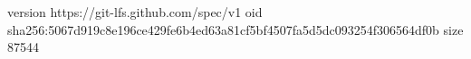 version https://git-lfs.github.com/spec/v1
oid sha256:5067d919c8e196ce429fe6b4ed63a81cf5bf4507fa5d5dc093254f306564df0b
size 87544
